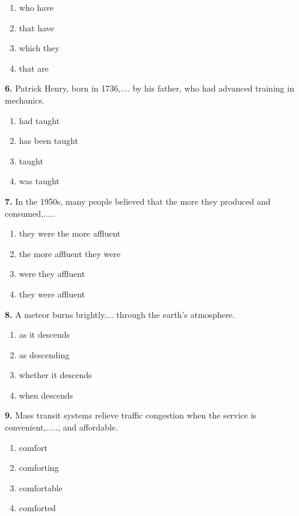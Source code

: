 \documentclass[12pt]{article}
\begin{document}
\begin{enumerate}[label=(\Alph*),leftmargin=*,itemsep=0.2em]
\item who have
\item that have
\item which they
\item that are
\end{enumerate}
\par
\vspace{0.25\baselineskip}
\noindent\textbf{6.} Patrick Henry, born in 1736,.... by his father, who had advanced training in mechanics.
\begin{enumerate}[label=(\Alph*),leftmargin=*,itemsep=0.2em]
\item had taught
\item has been taught
\item taught
\item was taught
\end{enumerate}
\par
\vspace{0.25\baselineskip}
\noindent\textbf{7.} In the 1950s, many people believed that the more they produced and consumed,.....
\begin{enumerate}[label=(\Alph*),leftmargin=*,itemsep=0.2em]
\item they were the more affluent
\item the more affluent they were
\item were they affluent
\item they were affluent
\end{enumerate}
\par
\vspace{0.25\baselineskip}
\noindent\textbf{8.} A meteor burns brightly.... through the earth's atmosphere.
\begin{enumerate}[label=(\Alph*),leftmargin=*,itemsep=0.2em]
\item as it descends
\item as descending
\item whether it descends
\item when descends
\end{enumerate}
\par
\vspace{0.25\baselineskip}
\noindent\textbf{9.} Mass transit systems relieve traffic congestion when the service is convenient,....., and affordable.
\begin{enumerate}[label=(\Alph*),leftmargin=*,itemsep=0.2em]
\item comfort
\item comforting
\item comfortable
\item comforted
\end{enumerate}
\end{document}
